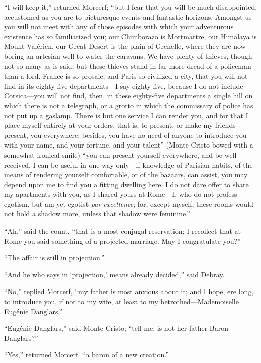 “I will keep it,” returned Morcerf; “but I fear that you will be much
disappointed, accustomed as you are to picturesque events and fantastic
horizons. Amongst us you will not meet with any of those episodes with
which your adventurous existence has so familiarized you; our
Chimborazo is Mortmartre, our Himalaya is Mount Valérien, our Great
Desert is the plain of Grenelle, where they are now boring an artesian
well to water the caravans. We have plenty of thieves, though not so
many as is said; but these thieves stand in far more dread of a
policeman than a lord. France is so prosaic, and Paris so civilized a
city, that you will not find in its eighty-five departments—I say
eighty-five, because I do not include Corsica—you will not find, then,
in these eighty-five departments a single hill on which there is not a
telegraph, or a grotto in which the commissary of police has not put up
a gaslamp. There is but one service I can render you, and for that I
place myself entirely at your orders, that is, to present, or make my
friends present, you everywhere; besides, you have no need of anyone to
introduce you—with your name, and your fortune, and your talent” (Monte
Cristo bowed with a somewhat ironical smile) “you can present yourself
everywhere, and be well received. I can be useful in one way only—if
knowledge of Parisian habits, of the means of rendering yourself
comfortable, or of the bazaars, can assist, you may depend upon me to
find you a fitting dwelling here. I do not dare offer to share my
apartments with you, as I shared yours at Rome—I, who do not profess
egotism, but am yet egotist \textit{par excellence}; for, except myself, these
rooms would not hold a shadow more, unless that shadow were feminine.”

“Ah,” said the count, “that is a most conjugal reservation; I recollect
that at Rome you said something of a projected marriage. May I
congratulate you?”

“The affair is still in projection.”

“And he who says in ‘projection,’ means already decided,” said Debray.

“No,” replied Morcerf, “my father is most anxious about it; and I hope,
ere long, to introduce you, if not to my wife, at least to my
betrothed—Mademoiselle Eugénie Danglars.”

“Eugénie Danglars,” said Monte Cristo; “tell me, is not her father
Baron Danglars?”

“Yes,” returned Morcerf, “a baron of a new creation.”

